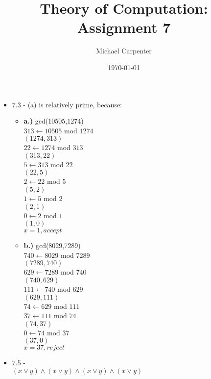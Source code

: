 \documentclass{article}
\title{Theory of Computation: Assignment 7}
\author{Michael Carpenter}
\date{\today}
\begin{document}
\maketitle

\begin{itemize}
  \item 7.3 - (a) is relatively prime, because:
    \begin{itemize}
      \item \textbf{a.)} gcd(10505,1274) \\
        $313 \leftarrow 10505$ mod $1274$ \\
        $(1274,313)$ \\
        $22 \leftarrow 1274$ mod $313$ \\
        $(313,22)$ \\
        $5 \leftarrow 313$ mod $22$ \\
        $(22,5)$ \\
        $2 \leftarrow 22$ mod $5$ \\
        $(5,2)$ \\
        $1 \leftarrow 5$ mod $2$ \\
        $(2,1)$ \\
        $0 \leftarrow 2$ mod $1$ \\
        $(1,0)$ \\
        $x = 1, accept$ \\
      \item \textbf{b.)} gcd(8029,7289) \\
        $740 \leftarrow 8029$ mod $7289$ \\
        $(7289,740)$ \\
        $629 \leftarrow 7289$ mod $740$ \\
        $(740,629)$ \\
        $111 \leftarrow 740$ mod $629$ \\
        $(629,111)$ \\
        $74 \leftarrow 629$ mod $111$ \\
        $37 \leftarrow 111$ mod $74$ \\
        $(74,37)$ \\
        $0 \leftarrow 74$ mod $37$ \\
        $(37,0)$ \\
        $x = 37, reject$
    \end{itemize}
  \item 7.5 - \\
    $(x\lor y)\land(x\lor\overline{y})\land(\overline{x}\lor y)\land(\overline{x}\lor\overline{y})$ \\

\end{itemize}
\end{document}
